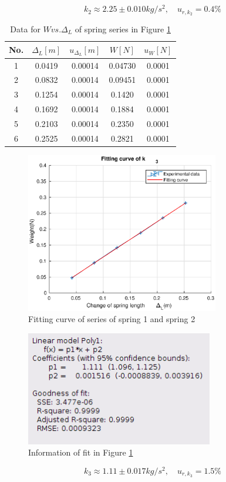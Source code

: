     \[
        k_2\approx 2.25\pm 0.010kg/s^2, \quad u_{r,k_2}=0.4\%
    \]
    \begin{table}[!ht] \small
        \centering
        \begin{tabular}{|c|c|c|c|c|}
            \hline
            No. & $\Delta_L[m]$ & $u_{\Delta_L}[m]$ & $W[N]$ & $u_{W}[N]$\\ \hline
            1 & 0.0419 & 0.00014& 0.04730 & 0.0001\\ \hline
            2 & 0.0832 & 0.00014& 0.09451 & 0.0001\\ \hline
            3 & 0.1254 & 0.00014& 0.1420 & 0.0001\\ \hline
            4 & 0.1692 & 0.00014& 0.1884 & 0.0001\\ \hline
            5 & 0.2103 & 0.00014& 0.2350 & 0.0001\\ \hline
            6 & 0.2525 & 0.00014& 0.2821 & 0.0001\\ \hline
        \end{tabular}
        \caption{Data for $W vs. \Delta_L$ of spring series in Figure \ref{k_3}}\label{k3data}
    \end{table}
    \newpage
    \begin{figure}[h]
        \centering    
        \includegraphics[height=7cm]{images/k3.eps}
        \caption{Fitting curve of series of spring 1 and spring 2}\label{k_3}
    \end{figure}
    \begin{figure}[!h]
        \centering
        \includegraphics[height=5cm]{images/k3info.png}
        \caption{Information of fit in Figure \ref{k_3}}\label{k3info}
    \end{figure}
    \[
        k_3\approx 1.11\pm 0.017kg/s^2, \quad u_{r,k_3}=1.5\%
    \]

